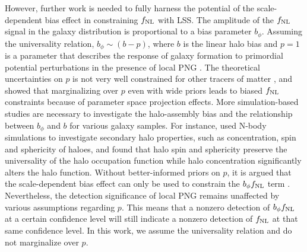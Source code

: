 However, further work is needed to fully harness the potential of the scale-dependent bias effect in constraining $f_{\rm NL}$ with LSS. The amplitude of the $f_{\rm NL}$ signal in the galaxy distribution is proportional to a bias parameter $b_{\phi}$. Assuming the universality relation, $b_{\phi} \sim (b - p)$, where $b$ is the linear halo bias and $p=1$ is a parameter that describes the response of galaxy formation to primordial potential perturbations in the presence of local PNG \citep[see, e.g.,][]{slosar2008constraints}. The theoretical uncertainties on $p$ is not very well constrained for other tracers of matter \citep{2020JCAP...12..013B, 2020JCAP...12..031B}, and \cite{2022JCAP...11..013B} showed that marginalizing over $p$ even with wide priors leads to biased $f_{\rm NL}$ constraints because of parameter space projection effects. More simulation-based studies are necessary to investigate the halo-assembly bias and the relationship between $b_{\phi}$ and $b$ for various galaxy samples. For instance, \cite{2023JCAP...01..023L} used N-body simulations to investigate secondary halo properties, such as concentration, spin and sphericity of haloes, and found that halo spin and sphericity preserve the universality of the halo occupation function while halo concentration significantly alters the halo function.  Without better-informed priors on $p$, it is argued that the scale-dependent bias effect can only  be used to constrain the $b_{\phi}f_{\rm NL}$ term \citep[see, e.g.,][]{2020JCAP...12..031B}. Nevertheless, the detection significance of local PNG remains unaffected by various assumptions regarding $p$. This means that a nonzero detection of $b_{\phi}f_{\rm NL}$ at a certain confidence level will still indicate a nonzero detection of $f_{\rm NL}$ at that same confidence level. In this work, we assume the universality relation and do not marginalize over $p$.  

